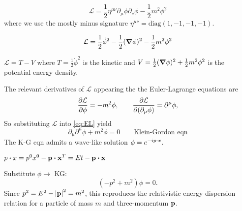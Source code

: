 \begin{example}

  \begin{equation}
    \mathcal{L} = \frac{1}{2} \eta^{\mu \nu} \partial_\mu \phi \partial_\nu \phi - \frac{1}{2} m^2 \phi^2
  \end{equation}
  where we use the mostly minus signature $\eta^{\mu \nu} = \text{diag}(1, -1, -1, -1)$.

  \begin{equation}
    \mathcal{L} = \frac{1}{2} \dot\phi^2 - \frac{1}{2} (\grad \phi)^2 - \frac{1}{2} m^2 \phi^2
  \end{equation}

  \begin{leftbar}
    \begin{remark}
      $\mathcal{L} = T- V$ where $T = \frac{1}{2} \dot \phi^2$ is the kinetic and $V = \frac{1}{2} (\grad \phi)^2 + \frac{1}{2}m^2 \phi^2$ is the potential energy density.
    \end{remark}
  \end{leftbar}

  The relevant derivatives of $\mathcal{L}$ appearing the the Euler-Lagrange equations are
  \begin{equation}
    \pdv{\mathcal{L}}{\phi} = -m^2\phi, \qquad \pdv{\mathcal{L}}{(\partial_\mu \phi)} = \partial^\mu \phi,
  \end{equation}
  So substituting $\mathcal{L}$ into \eqref{eq:EL} yield
  \begin{equation}
    \boxed{\partial_\mu \partial^\mu \phi + m^2 \phi = 0} \qquad \text{Klein-Gordon eqn}
  \end{equation}
  The K-G eqn admits a wave-like solution $\phi = e^{-i p \vdot x}$.

  \begin{leftbar}
    \begin{remark}
      $p \vdot x = p^0 x^0 - \vb p \vdot \vb x^T = E t - \vb p \vdot \vb x$
    \end{remark}
  \end{leftbar}

  Substitute $\phi \rightarrow$ KG:
  \begin{equation}
    (-p^2 + m^2)\phi = 0.
  \end{equation}
  Since $p^2 = E^2 - \abs{\vb{p}}^2 = m^2$, this reproduces the relativistic energy dispersion relation for a particle of mass $m$ and three-momentum $\vb{p}$.
\end{example}




